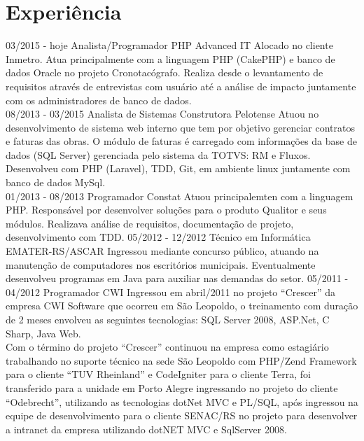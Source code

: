 \documentclass[]{friggeri-cv}
\begin{document}
\section{Experiência}
\begin{entrylist}
  \entry
    {03/2015 - hoje}
    {Analista/Programador PHP}
    {Advanced IT}
    {Alocado no cliente Inmetro. Atua principalmente com a linguagem PHP (CakePHP) e banco de dados Oracle no projeto Cronotacógrafo. Realiza desde o levantamento de requisitos através de entrevistas com usuário até a análise de impacto juntamente com os administradores de banco de dados.\\}
 \entry
    {08/2013 - 03/2015}
    {Analista de Sistemas}
    {Construtora Pelotense}
    {Atuou no desenvolvimento de sistema web interno que tem por objetivo gerenciar contratos e faturas das obras. O módulo de faturas é carregado com informações da base de dados (SQL Server) gerenciada pelo sistema da TOTVS: RM e Fluxos. Desenvolveu com PHP (Laravel), TDD, Git, em ambiente linux juntamente com banco de dados MySql.\\}
    \entry
    {01/2013 - 08/2013}
    {Programador}
    {Constat}
    {Atuou principalemten com a linguagem PHP. Responsável por desenvolver soluções para o produto Qualitor e seus módulos. Realizava análise de requisitos, documentação de projeto, desenvolvimento com TDD.}
    \entry
    {05/2012 - 12/2012}
    {Técnico em Informática}
    {EMATER-RS/ASCAR}
    {Ingressou mediante concurso público, atuando na manutenção de computadores nos escritórios municipais. Eventualmente desenvolveu programas em Java para auxiliar nas demandas do setor.}
    \entry
    {05/2011 - 04/2012}
    {Programador}
    {CWI}
    {Ingressou em abril/2011 no projeto “Crescer” da empresa CWI Software que ocorreu em São Leopoldo, o
treinamento com duração de 2 meses envolveu as seguintes tecnologias: SQL Server 2008, ASP.Net, C Sharp, Java Web.\\
Com o término do projeto “Crescer” continuou na empresa como estagiário trabalhando no suporte técnico na sede São Leopoldo com PHP/Zend Framework para o cliente “TUV Rheinland” e CodeIgniter para o cliente Terra, foi transferido para a unidade em Porto Alegre ingressando no projeto do cliente “Odebrecht”, utilizando as tecnologias dotNet MVC e PL/SQL, após ingressou na equipe de desenvolvimento para o cliente SENAC/RS no projeto para desenvolver a intranet da empresa utilizando dotNET MVC e SqlServer 2008.}
\end{entrylist}
\end{document}
